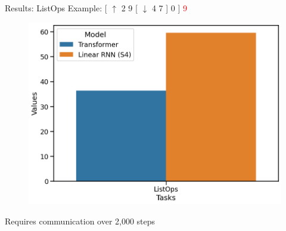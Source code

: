 




\begin{frame}[c]{Results: ListOps \cite{gu2022parameterization}}
    \centering
        Example: [ $\uparrow$ 2 9 [ $\downarrow$ 4 7 ] 0 ] \textcolor{red}{9}
        
    \begin{figure}
        \centering

    \includegraphics[height=0.6\textheight,clip,trim={0.1cm 0.1cm 0.1cm 0.1cm}]{Figs/listops-s4.png}
        \label{fig:my_label}
    \end{figure}
    Requires communication over 2,000  steps
    
\end{frame}


